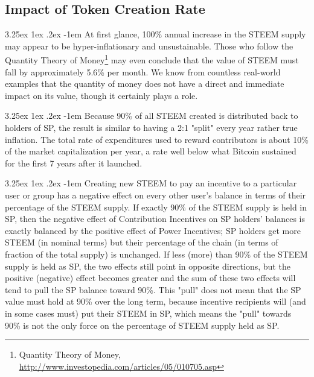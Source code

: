 \documentclass{article}
\makeatletter
\renewcommand\paragraph{\@startsection{paragraph}{5}{\z@}%
  {3.25ex \@plus1ex \@minus.2ex}%
  {-1em}%
  {\normalfont\normalsize\bfseries}}
\makeatother
\begin{document}
        \subsection{Impact of Token Creation Rate}

            \paragraph{}
                At first glance, 100\% annual increase in the STEEM supply
may appear to be hyper-inflationary and unsustainable. Those who follow the
Quantity Theory of Money\footnote{Quantity Theory of Money,\newline
\url{http://www.investopedia.com/articles/05/010705.asp}} may even conclude
that the value of STEEM must fall by approximately 5.6\% per month. We know
from countless real-world examples that the quantity of money does not have
a direct and immediate impact on its value, though it certainly plays a
role.

            \paragraph{}
                Because 90\% of all STEEM created is distributed back to
holders of SP, the result is similar to having a 2:1 "split" every year
rather true inflation. The total rate of expenditures used to reward
contributors is about 10\% of the market capitalization per year, a rate
well below what Bitcoin sustained for the first 7 years after it launched.

            \paragraph{}
                Creating new STEEM to pay an incentive to a particular user
or group has a negative effect on every other user's balance in terms of
their percentage of the STEEM supply. If exactly 90\% of the STEEM supply
is held in SP, then the negative effect of Contribution Incentives on SP
holders' balances is exactly balanced by the positive effect of Power
Incentives; SP holders get more STEEM (in nominal terms) but their
percentage of the chain (in terms of fraction of the total supply) is
unchanged. If less (more) than 90\% of the STEEM supply is held as SP, the
two effects still point in opposite directions, but the positive (negative)
effect becomes greater and the sum of these two effects will tend to pull
the SP balance toward 90\%. This "pull" does not mean that the SP value
must hold at 90\% over the long term, because incentive recipients will
(and in some cases must) put their STEEM in SP, which means the "pull"
towards 90\% is not the only force on the percentage of STEEM supply held
as SP.
\end{document}
